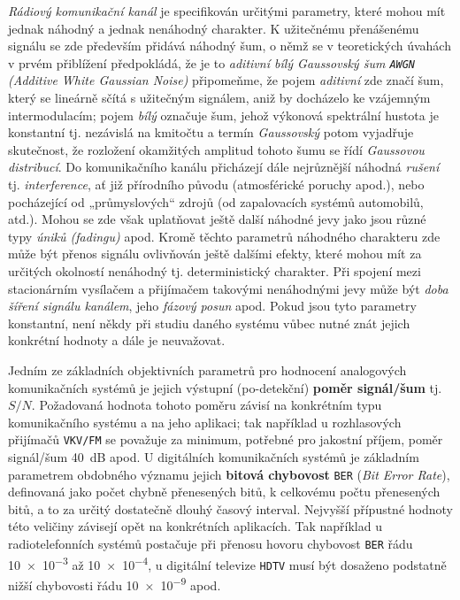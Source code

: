     \emph{Rádiový komunikační kanál} je specifikován určitými parametry, které mohou mít jednak 
    náhodný a jednak nenáhodný charakter. K užitečnému přenášenému signálu se zde především přidává 
    náhodný šum, o němž se v teoretických úvahách v prvém přiblížení předpokládá, že je to 
    \emph{aditivní bílý Gaussov\-ský šum \texttt{AWGN} (Additive White Gaussian Noise)} připomeňme, 
    že pojem \emph{aditivní} zde značí šum, který se lineárně sčítá s užitečným signálem, aniž by 
    docházelo ke vzájemným intermodulacím; pojem \emph{bílý} označuje šum, jehož výkonová 
    spektrální hustota je konstantní tj. nezávislá na kmitočtu a termín \emph{Gaussovský} potom 
    vyjadřuje skutečnost, že rozložení okamžitých amplitud tohoto šumu se řídí \emph{Gaussovou 
    distribucí}. Do komunikačního kanálu přicházejí dále nejrůznější náhodná \emph{rušení} tj. 
    \emph{interference}, ať již přírodního původu (atmosférické poruchy apod.), nebo pocházející od 
    „průmyslových“ zdrojů (od zapalovacích systémů automobilů, atd.). Mohou se zde však uplatňovat 
    ještě další náhodné jevy jako jsou různé typy \emph{úniků (fadingu)} apod. Kromě těchto 
    parametrů náhodného charakteru zde může být přenos signálu ovlivňován ještě dalšími efekty, 
    které mohou mít za určitých okolností nenáhodný tj. deterministický charakter. Při spojení mezi 
    stacionárním vysílačem a přijímačem takovými nenáhodnými jevy může být \emph{doba šíření 
    signálu kanálem}, jeho \emph{fázový posun} apod. Pokud jsou tyto parametry konstantní, není 
    někdy při studiu daného systému vůbec nutné znát jejich konkrétní hodnoty a dále je neuvažovat.
    
    Jedním ze základních objektivních parametrů pro hodnocení analogových komunikačních systémů je 
    jejich výstupní (po-detekční) \textbf{poměr signál/šum} tj. \(S/N\). Požadovaná hodnota tohoto 
    poměru závisí na konkrétním typu komunikačního systému a na jeho aplikaci; tak například u 
    rozhlasových přijímačů \texttt{VKV/FM} se považuje za minimum, potřebné pro jakostní příjem, 
    poměr signál/šum \qty{40}{\dB} apod. U digitálních komunikačních systémů je základním parametrem 
    obdobného významu jejich \textbf{bitová chybovost} \texttt{BER} (\emph{Bit Error Rate}), 
    definovaná jako počet chybně přenesených bitů, k celkovému počtu přenesených bitů, a to za 
    určitý dostatečně dlouhý časový interval. Nejvyšší přípustné hodnoty této ve\-li\-či\-ny 
    závisejí opět na konkrétních aplikacích. Tak například u radiotelefonních systémů postačuje při 
    přenosu hovoru chybovost \texttt{BER} řádu \num{10e-3} až \num{10e-4}, u digitální televize 
    \texttt{HDTV} musí být dosaženo podstatně nižší chybovosti řádu \num{10e-9} apod.
    
